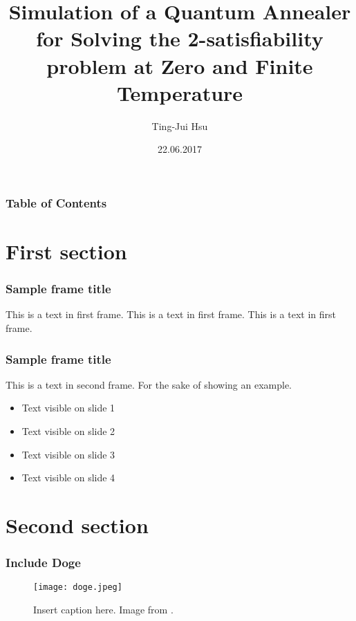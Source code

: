 \documentclass{beamer}
\title{Simulation of a Quantum Annealer for Solving the 2-satisfiability problem at Zero and Finite Temperature}
\author{Ting-Jui Hsu}
\institute{Quantum Information Group}
\date{22.06.2017}
\begin{document}
\frame{\titlepage}


\begin{frame}
	\frametitle{Table of Contents}
	\tableofcontents
\end{frame}



\section{First section}
\begin{frame}
\frametitle{Sample frame title}
This is a text in first frame. This is a text in first frame. This is a text in first frame.
\end{frame}




\begin{frame}
	\frametitle{Sample frame title}
	This is a text in second frame. 
	For the sake of showing an example.
	
	\begin{itemize}
		\item<1-> Text visible on slide 1
		\item<2-> Text visible on slide 2
		\item<3-> Text visible on slide 3
		\item<4-> Text visible on slide 4
	\end{itemize}
	
\end{frame}
\section{Second section}
\begin{frame}
	\frametitle{Include Doge}
	\begin{figure}[h]
		\centering
		\texttt{[image: doge.jpeg]}
		\caption{Insert caption here. Image from \cite{lenna}. }
		\label{example_figure}
	\end{figure}
\end{frame}

 
\end{document}
